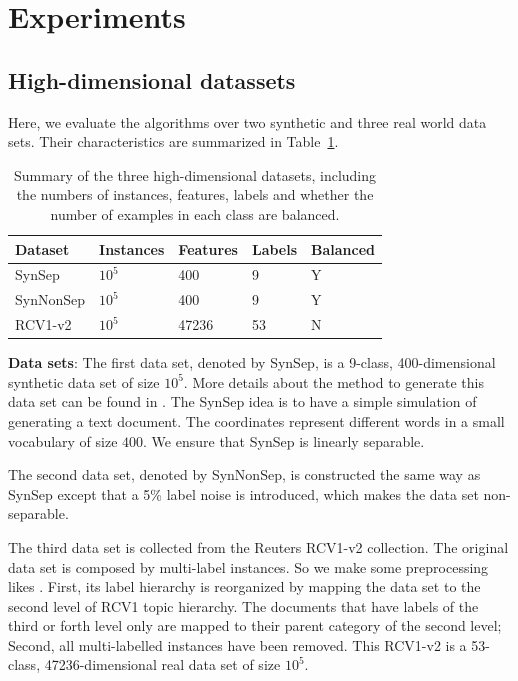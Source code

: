 \documentclass[twocolumn]{article}
\begin{document}
\section{Experiments}

\subsection{High-dimensional datassets}
\label{subsec:BPAE}
Here, we evaluate the algorithms over two synthetic and three real world data sets. Their characteristics are summarized in Table~\ref{table:mce}.

\begin{table}[h]
	\caption{Summary of the three high-dimensional datasets, including the numbers of instances, features, labels and whether the number of examples in each class are balanced.}
	\label{table:mce}
	\begin{center}
		\begin{tabular}{l l l l l}
			{\bf Dataset}  & {\bf Instances} & {\bf Features} & {\bf Labels}& {\bf Balanced}\\
			\hline
			SynSep & $10^5$ 	& 400 	& 9 & Y\\
			
			SynNonSep & $10^5$ & 400 	& 9 & Y\\
			
			RCV1-v2  & $10^5$ 	& 47236 	& 53 & N\\
			
			
		\end{tabular}
	\end{center}
\end{table}

\textbf{Data sets}:
The first data set, denoted by SynSep,  is a 9-class, 400-dimensional synthetic data set of size $10^5$. More details about the method to generate this data set can be found in \cite{kakade2008efficient}. The SynSep  idea is to have a simple simulation of generating a text document. The coordinates represent different words in a small vocabulary of size $400$. We ensure that SynSep is linearly separable. 

The second data set, denoted by SynNonSep, is constructed  the same way as  SynSep except that a 5\% label noise is introduced, which makes the data set non-separable. 

The third data set is collected from the Reuters RCV1-v2 collection\cite{David04RCV}. The original data set is composed by multi-label instances. So we make some preprocessing likes \cite{RB08a}. First, its label hierarchy is reorganized by mapping the data set to the second level of RCV1 topic hierarchy. The documents that have labels of the third or forth level only are mapped to their parent category of the second level; Second, all multi-labelled instances have been removed. This RCV1-v2 is a 53-class,  47236-dimensional real data set of size $10^5$. 
\end{document}
